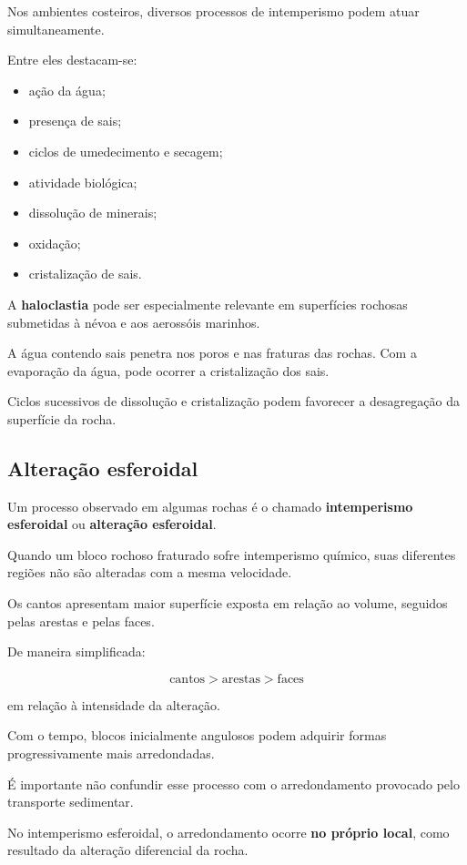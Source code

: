 Nos ambientes costeiros, diversos processos de intemperismo podem atuar simultaneamente.

Entre eles destacam-se:

\begin{itemize}
    \item ação da água;
    \item presença de sais;
    \item ciclos de umedecimento e secagem;
    \item atividade biológica;
    \item dissolução de minerais;
    \item oxidação;
    \item cristalização de sais.
\end{itemize}

A \textbf{haloclastia} pode ser especialmente relevante em superfícies rochosas submetidas à névoa e aos aerossóis marinhos.

A água contendo sais penetra nos poros e nas fraturas das rochas. Com a evaporação da água, pode ocorrer a cristalização dos sais.

Ciclos sucessivos de dissolução e cristalização podem favorecer a desagregação da superfície da rocha.

\subsection{Alteração esferoidal}

Um processo observado em algumas rochas é o chamado \textbf{intemperismo esferoidal} ou \textbf{alteração esferoidal}.

Quando um bloco rochoso fraturado sofre intemperismo químico, suas diferentes regiões não são alteradas com a mesma velocidade.

Os cantos apresentam maior superfície exposta em relação ao volume, seguidos pelas arestas e pelas faces.

De maneira simplificada:

\[
\text{cantos}
>
\text{arestas}
>
\text{faces}
\]

em relação à intensidade da alteração.

Com o tempo, blocos inicialmente angulosos podem adquirir formas progressivamente mais arredondadas.

É importante não confundir esse processo com o arredondamento provocado pelo transporte sedimentar.

No intemperismo esferoidal, o arredondamento ocorre \textbf{no próprio local}, como resultado da alteração diferencial da rocha.

